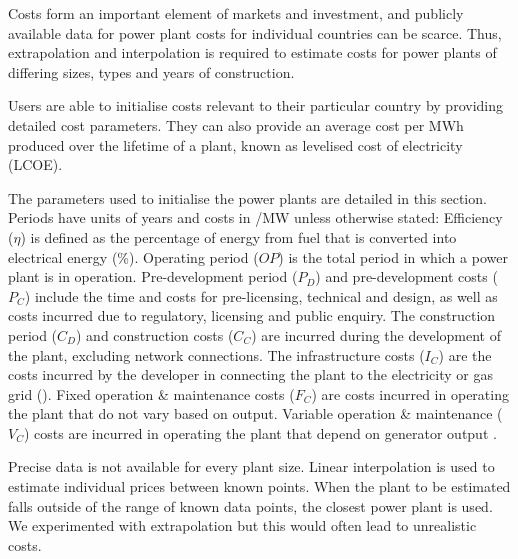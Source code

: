 Costs form an important element of markets and investment, and publicly available data for power plant costs for individual countries can be scarce. Thus, extrapolation and interpolation is required to estimate costs for power plants of differing sizes, types and years of construction.

Users are able to initialise costs relevant to their particular country by providing detailed cost parameters. They can also provide an average cost per MWh produced over the lifetime of a plant, known as levelised cost of electricity (LCOE).

The parameters used to initialise the power plants are detailed in this section. Periods have units of years and costs in \textsterling/MW unless otherwise stated: Efficiency ($\eta$) is defined as the percentage of energy from fuel that is converted into electrical energy (\%). Operating period ($OP$) is the total period in which a power plant is in operation. Pre-development period ($P_D$) and pre-development costs ($P_C$) include the time and costs for pre-licensing, technical and design, as well as costs incurred due to regulatory, licensing and public enquiry. The construction period ($C_D$) and construction costs ($C_C$) are incurred during the development of the plant, excluding network connections. The infrastructure costs ($I_C$) are the costs incurred by the developer in connecting the plant to the electricity or gas grid (\textsterling). Fixed operation \& maintenance costs ($F_C$) are costs incurred in operating the plant that do not vary based on output. Variable operation \& maintenance ($V_C$) costs are incurred in operating the plant that depend on generator output \cite{Ltd2016}.




Precise data is not available for every plant size. Linear interpolation is used to estimate individual prices between known points. When the plant to be estimated falls outside of the range of known data points, the closest power plant is used. We experimented with extrapolation but this would often lead to unrealistic costs. %

